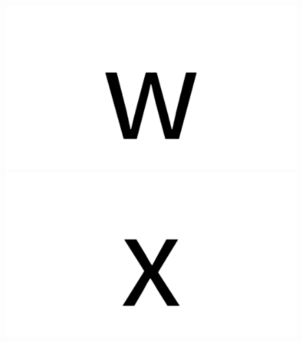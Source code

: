 \documentclass{article}
\begin{document}
\begin{figure}[H]
  \includegraphics[width=\linewidth]{w}
\endminipage\hfill
{}
  \includegraphics[width=\linewidth]{x}
\endminipage\hfill
\end{figure}
\end{document}
